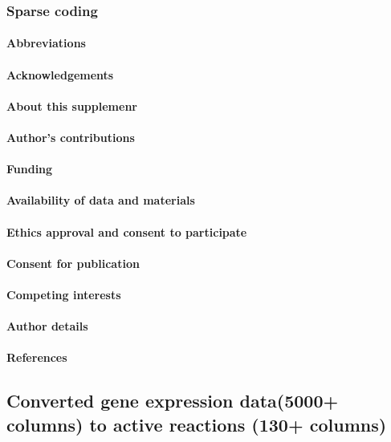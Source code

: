 \documentclass[10pt,twocolumn,twoside,lineno]{gsajnl}
\begin{document}
\subsubsection{Sparse coding}


\paragraph{Abbreviations}
\paragraph{Acknowledgements}
\paragraph{About this supplemenr}
\paragraph{Author's contributions}
\paragraph{Funding}
\paragraph{Availability of data and materials}
\paragraph{Ethics approval and consent to participate}
\paragraph{Consent for publication}
\paragraph{Competing interests}
\paragraph{Author details}
\newpage
\paragraph{References}



\subsection{Converted gene expression data(5000+ columns) to active reactions (130+ columns)}
\end{document}
